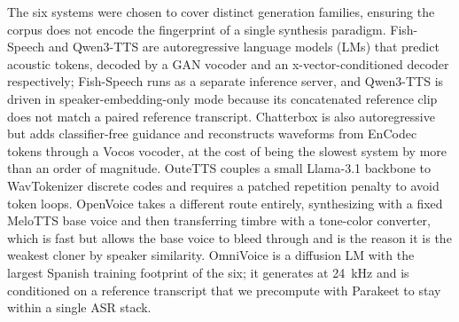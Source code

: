 \documentclass[11pt]{article}
\begin{document}
The six systems were chosen to cover distinct generation families,
ensuring the corpus does not encode the fingerprint of a single
synthesis paradigm. Fish-Speech and Qwen3-TTS are autoregressive language models (LMs)
that predict acoustic tokens, decoded by a GAN vocoder and an
x-vector-conditioned decoder respectively; Fish-Speech runs as a
separate inference server, and Qwen3-TTS is driven in
speaker-embedding-only mode because its concatenated reference clip does
not match a paired reference transcript. Chatterbox is also
autoregressive but adds classifier-free guidance and reconstructs
waveforms from EnCodec tokens through a Vocos vocoder, at the cost of
being the slowest system by more than an order of magnitude. OuteTTS
couples a small Llama-3.1 backbone to WavTokenizer discrete codes and
requires a patched repetition penalty to avoid token loops. OpenVoice
takes a different route entirely, synthesizing with a fixed MeloTTS
base voice and then transferring timbre with a tone-color converter, which
is fast but allows the base voice to bleed through and is the reason it
is the weakest cloner by speaker similarity. OmniVoice is a diffusion
LM with the largest Spanish training footprint of the six;
it generates at \SI{24}{\kilo\hertz} and is conditioned on a reference
transcript that we precompute with Parakeet to stay within a single ASR
stack.
\end{document}
